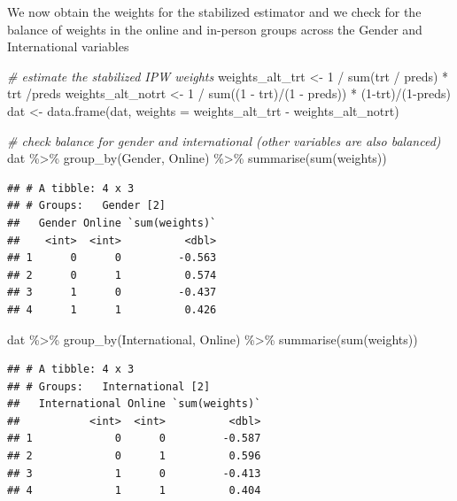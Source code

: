 \documentclass[
  ignorenonframetext,
]{beamer}
\newenvironment{Shaded}{\begin{snugshade}}{\end{snugshade}}
\newcommand{\AttributeTok}[1]{\textcolor[rgb]{0.77,0.63,0.00}{#1}}
\newcommand{\CommentTok}[1]{\textcolor[rgb]{0.56,0.35,0.01}{\textit{#1}}}
\newcommand{\DecValTok}[1]{\textcolor[rgb]{0.00,0.00,0.81}{#1}}
\newcommand{\FunctionTok}[1]{\textcolor[rgb]{0.00,0.00,0.00}{#1}}
\newcommand{\NormalTok}[1]{#1}
\newcommand{\OtherTok}[1]{\textcolor[rgb]{0.56,0.35,0.01}{#1}}
\newcommand{\SpecialCharTok}[1]{\textcolor[rgb]{0.00,0.00,0.00}{#1}}
\begin{document}
\begin{frame}[fragile]{}
\protect\hypertarget{section-16}{}
We now obtain the weights for the stabilized estimator and we check for
the balance of weights in the online and in-person groups across the
Gender and International variables

\vspace{12pt}
\tiny

\begin{Shaded}
\begin{Highlighting}[]
\CommentTok{\# estimate the stabilized IPW weights  }
\NormalTok{weights\_alt\_trt }\OtherTok{\textless{}{-}} \DecValTok{1} \SpecialCharTok{/} \FunctionTok{sum}\NormalTok{(trt }\SpecialCharTok{/}\NormalTok{ preds) }\SpecialCharTok{*}\NormalTok{ trt }\SpecialCharTok{/}\NormalTok{preds}
\NormalTok{weights\_alt\_notrt }\OtherTok{\textless{}{-}} \DecValTok{1} \SpecialCharTok{/} \FunctionTok{sum}\NormalTok{((}\DecValTok{1} \SpecialCharTok{{-}}\NormalTok{ trt)}\SpecialCharTok{/}\NormalTok{(}\DecValTok{1} \SpecialCharTok{{-}}\NormalTok{ preds)) }\SpecialCharTok{*}\NormalTok{ (}\DecValTok{1}\SpecialCharTok{{-}}\NormalTok{trt)}\SpecialCharTok{/}\NormalTok{(}\DecValTok{1}\SpecialCharTok{{-}}\NormalTok{preds)}
\NormalTok{dat }\OtherTok{\textless{}{-}} \FunctionTok{data.frame}\NormalTok{(dat, }\AttributeTok{weights =}\NormalTok{ weights\_alt\_trt }\SpecialCharTok{{-}}\NormalTok{ weights\_alt\_notrt)}

\CommentTok{\# check balance for gender and international (other variables are also balanced)}
\NormalTok{dat }\SpecialCharTok{\%\textgreater{}\%} \FunctionTok{group\_by}\NormalTok{(Gender, Online) }\SpecialCharTok{\%\textgreater{}\%} \FunctionTok{summarise}\NormalTok{(}\FunctionTok{sum}\NormalTok{(weights))}
\end{Highlighting}
\end{Shaded}

\begin{verbatim}
## # A tibble: 4 x 3
## # Groups:   Gender [2]
##   Gender Online `sum(weights)`
##    <int>  <int>          <dbl>
## 1      0      0         -0.563
## 2      0      1          0.574
## 3      1      0         -0.437
## 4      1      1          0.426
\end{verbatim}

\begin{Shaded}
\begin{Highlighting}[]
\NormalTok{dat }\SpecialCharTok{\%\textgreater{}\%} \FunctionTok{group\_by}\NormalTok{(International, Online) }\SpecialCharTok{\%\textgreater{}\%} \FunctionTok{summarise}\NormalTok{(}\FunctionTok{sum}\NormalTok{(weights))}
\end{Highlighting}
\end{Shaded}

\begin{verbatim}
## # A tibble: 4 x 3
## # Groups:   International [2]
##   International Online `sum(weights)`
##           <int>  <int>          <dbl>
## 1             0      0         -0.587
## 2             0      1          0.596
## 3             1      0         -0.413
## 4             1      1          0.404
\end{verbatim}
\end{frame}
\end{document}
